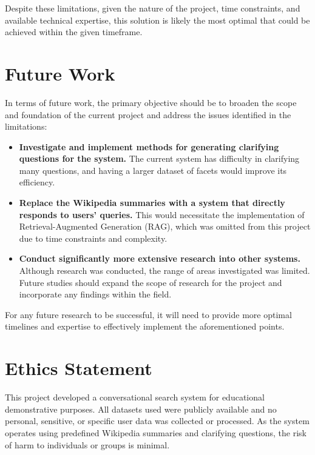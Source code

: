 \documentclass[11pt]{article}
\begin{document}
Despite these limitations, given the nature of the project, time constraints, and available technical expertise, this solution is likely the most optimal that could be achieved within the given timeframe.


\section*{Future Work}

In terms of future work, the primary objective should be to broaden the scope and foundation of the current project and address the issues identified in the limitations:

\begin{itemize}
    \item \textbf{Investigate and implement methods for generating clarifying questions for the system.} The current system has difficulty in clarifying many questions, and having a larger dataset of facets would improve its efficiency.
    
    \item \textbf{Replace the Wikipedia summaries with a system that directly responds to users' queries.} This would necessitate the implementation of Retrieval-Augmented Generation (RAG), which was omitted from this project due to time constraints and complexity.
    
    \item \textbf{Conduct significantly more extensive research into other systems.} Although research was conducted, the range of areas investigated was limited. Future studies should expand the scope of research for the project and incorporate any findings within the field.
\end{itemize}

For any future research to be successful, it will need to provide more optimal timelines and expertise to effectively implement the aforementioned points.


\section*{Ethics Statement}
This project developed a conversational search system for educational demonstrative purposes. All datasets used were publicly available and no personal, sensitive, or specific user data was collected or processed. As the system operates using predefined Wikipedia summaries and clarifying questions, the risk of harm to individuals or groups is minimal. 




\end{document}
